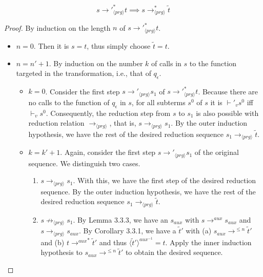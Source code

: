 \begin{lemma}
\[
s {\longrightarrow'}_{\langle prg \rangle}^* t \implies s \longrightarrow^*_{\langle prg \rangle} \widetilde{t}
\]

\begin{proof}

By induction on the length $n$ of $s {\longrightarrow'}_{\langle prg \rangle}^* t$.

\begin{itemize}
\item $n = 0$. Then it is $s = t$, thus simply choose $\widetilde{t} = t$.

\item $n = n' + 1$. By induction on the number $k$ of calls in $s$ to the function targeted in the transformation, i.e., that of $q_\epsilon$.
\begin{itemize}
\item $k = 0$. Consider the first step $s {\longrightarrow'}_{\langle prg \rangle} s_1$ of $s {\longrightarrow'}_{\langle prg \rangle}^* t$. Because there are no calls to the function of $q_\epsilon$ in $s$, for all subterms $s^0$ of $s$ it is $\vdash'_v s^0$ iff $\vdash_v s^0$. Consequently, the reduction step from $s$ to $s_1$ is also possible with reduction relation $\longrightarrow_{\langle prg \rangle}$, that is, $s \longrightarrow_{\langle prg \rangle} s_1$. By the outer induction hypothesis, we have the rest of the desired reduction sequence $s_1 \longrightarrow_{\langle prg \rangle} \widetilde{t}$.

\item $k = k' + 1$. Again, consider the first step $s {\longrightarrow'}_{\langle prg \rangle} s_1$ of the original sequence. We distinguish two cases.
\begin{enumerate}
\item $s \longrightarrow_{\langle prg \rangle} s_1$. With this, we have the first step of the desired reduction sequence. By the outer induction hypothesis, we have the rest of the desired reduction sequence $s_1 \longrightarrow_{\langle prg \rangle} \widetilde{t}$.

\item $s \not\longrightarrow_{\langle prg \rangle} s_1$. By Lemma 3.3.3, we have an $s_{aux}$ with $s \longrightarrow^{aux} s_{aux}$ and $s \longrightarrow_{\langle prg \rangle} s_{aux}$. By Corollary 3.3.1, we have a $\widetilde{t}'$ with (a) $s_{aux} \longrightarrow^{\leq n} \widetilde{t}'$ and (b) $t {\longrightarrow^{aux}}^* \widetilde{t}'$ and thus $\langle \widetilde{t}' \rangle^{aux^{-1}} = t$. Apply the inner induction hypothesis to $s_{aux} \longrightarrow^{\leq n} \widetilde{t}'$ to obtain the desired sequence.
\end{enumerate}
\end{itemize}
\end{itemize}

\end{proof}

\end{lemma}


